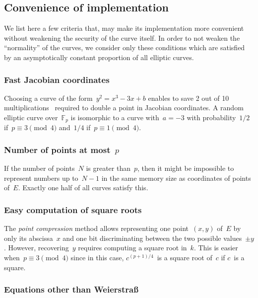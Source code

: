 \documentclass{article}
\def\F{\mathbb{F}}
\begin{document}
\subsection{Convenience of implementation}
\label{ss:convenience}

We list here a few criteria that,
may make its implementation more convenient
without weakening the security of the curve itself.
In order to not weaken the ``normality'' of the curves,
we consider only these conditions which are satisfied
by an asymptotically constant proportion of all elliptic curves.

\subsubsection{Fast Jacobian coordinates}

Choosing a curve of the form~$y^2 = x^3 - 3 x + b$
enables to save 2 out of 10 multiplications~\cite{ieeep1363}
required to double a point in Jacobian coordinates.
A random elliptic curve over~$\F_p$
is isomorphic to a curve with~$a = -3$
with probability~$1/2$ if~$p ≡ 3 \pmod{4}$ and~$1/4$ if~$p ≡ 1 \pmod{4}$.

\subsubsection{Number of points at most~$p$}

If the number of points~$N$ is greater than~$p$,
then it might be impossible to represent numbers up to~$N-1$
in the same memory size as coordinates of points of~$E$.
Exactly one half of all curves satisfy this.

\subsubsection{Easy computation of square roots}

The \emph{point compression} method allows representing
one point~$(x,y)$ of~$E$ by only its abscissa~$x$ and
one bit discriminating between the two possible values~$±y$.
However, recovering~$y$ requires computing a square root in~$k$.
This is easier when~$p ≡ 3 \pmod{4}$ since
in this case, $c^{(p+1)/4}$~is a square root of~$c$ if $c$~is a square.

\subsubsection{Equations other than Weierstraß}
\end{document}

